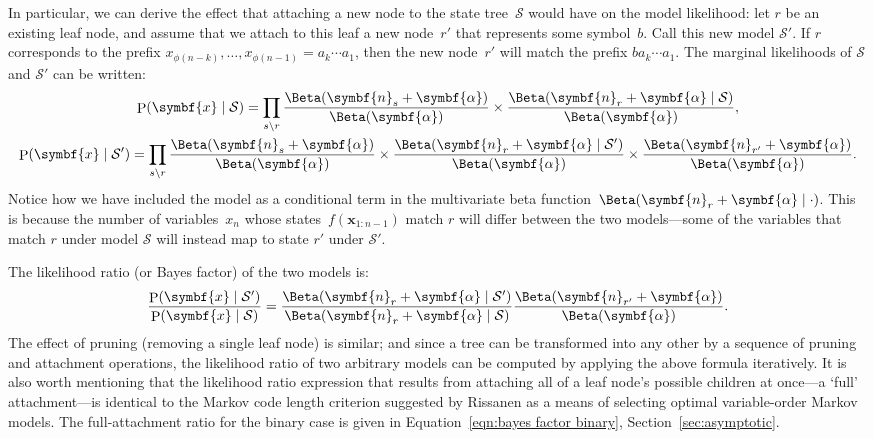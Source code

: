 \documentclass[12pt,a4paper]{article}
\newcommand\mc[1]{\mathcal{#1}}               %
\newcommand\ub[1]{\symbf{#1}}                 %
\DeclareMathOperator\Pb{P}                    %
\DeclarePairedDelimiter\lr{\lparen}{\rparen}  %
\begin{document}
In particular, we can derive the effect that attaching a new node to the state
tree~\(\mc{S}\) would have on the model likelihood: let \(r\) be an existing
leaf node, and assume that we attach to this leaf a new node~\(r'\) that
represents some symbol~\(b\). Call this new model \(\mc{S}'\). If \(r\)
corresponds to the prefix \(x_{\phi(n-k)}, \dots, x_{\phi(n-1)} = a_k \dotsb
a_1\), then the new node~\(r'\) will match the prefix \(b a_k \dotsb a_1\). The
marginal likelihoods of \(\mc{S}\) and \(\mc{S}'\) can be written:
\begin{gather*}
  \Pb\lr{\ub{x} \mid \mc{S}} = \prod_{s\setminus r}
    \frac{\Beta\lr{\ub{n}_s + \ub{\alpha}}}{\Beta\lr{\ub{\alpha}}} \times
    \frac{\Beta\lr{\ub{n}_r + \ub{\alpha} \mid \mc{S}}}
    {\Beta\lr{\ub{\alpha}}}, \\
  \Pb\lr{\ub{x} \mid \mc{S}'} = \prod_{s\setminus r}
    \frac{\Beta\lr{\ub{n}_s + \ub{\alpha}}}{\Beta\lr{\ub{\alpha}}} \times
    \frac{\Beta\lr{\ub{n}_r + \ub{\alpha} \mid \mc{S}'}}{\Beta\lr{\ub{\alpha}}}
    \times \frac{\Beta\lr{\ub{n}_{r'} + \ub{\alpha}}}{\Beta\lr{\ub{\alpha}}}.
\end{gather*}
Notice how we have included the model as a conditional term in the multivariate
beta function~\(\Beta(\ub{n}_r + \ub{\alpha} \mid \cdot)\). This is because the
number of variables~\(x_n\) whose states~\(f(\ub{x}_{1:n-1})\) match \(r\) will
differ between the two models---some of the variables that match \(r\) under
model \(\mc{S}\) will instead map to state \(r'\) under \(\mc{S}'\).

The likelihood ratio (or Bayes factor) of the two models is:
\begin{equation}\label{eqn:bayes factor}
  \frac{\Pb\lr{\ub{x} \mid \mc{S}'}}{\Pb\lr{\ub{x} \mid \mc{S}}} =
    \frac{\Beta\lr{\ub{n}_r + \ub{\alpha} \mid \mc{S}'}}
    {\Beta\lr{\ub{n}_r + \ub{\alpha} \mid \mc{S}}}
    \frac{\Beta\lr{\ub{n}_{r'} + \ub{\alpha}}}{\Beta\lr{\ub{\alpha}}}.
\end{equation}
The effect of pruning (removing a single leaf node) is similar; and since a tree
can be transformed into any other by a sequence of pruning and attachment
operations, the likelihood ratio of two arbitrary models can be computed by
applying the above formula iteratively. It is also worth mentioning that the
likelihood ratio expression that results from attaching all of a leaf node's
possible children at once---a `full' attachment---is identical to the Markov
code length criterion suggested by Rissanen as a means of selecting optimal
variable-order Markov models. The full-attachment ratio for the binary case is
given in Equation~\eqref{eqn:bayes factor binary}, Section~\ref{sec:asymptotic}.
\end{document}
